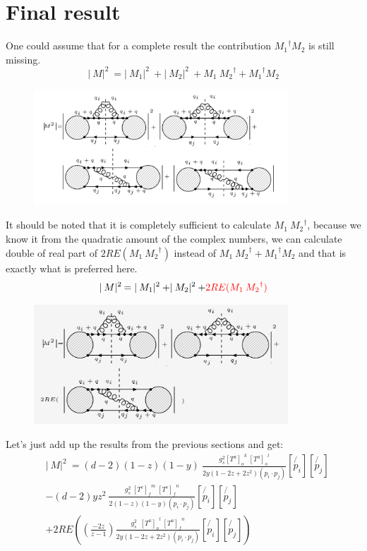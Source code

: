 \section{Final result}
One could assume that for a complete result the contribution $ {M_1}^{\dagger} M_2 $ is still missing.
\begin{equation}
\lvert\:M\lvert^2\: = \lvert\:M_1\lvert^2\:+\lvert\:M_2\lvert^2\:+ M_1\: {M_2}^{\dagger} +{M_1}^{\dagger} M_2
\end{equation}
\begin{figure}[h!]
\centering
\includegraphics[width=0.85\textwidth]{images/QQ/qqgMSquer.png}
\end{figure}
It should be noted that it is completely sufficient to calculate $M_1\: {M_2}^{\dagger}$, because we know it from the quadratic amount of the complex numbers, we can calculate double of real part of $2RE(M_1\: {M_2}^{\dagger})$ instead of $ M_1\: {M_2}^{\dagger} +{M_1}^{\dagger} M_2 $ and that is exactly what is preferred here.
\begin{equation}
\lvert\:M\lvert^2\: = \lvert\:M_1\lvert^2\:+\lvert\:M_2\lvert^2\:+ {\color[RGB]{255,0,0} 2RE(M_1\: {M_2}^{\dagger})}
\end{equation}
\begin{figure}[h!]
\centering
\includegraphics[width=0.85\textwidth]{images/QQ/REqqgMSquer.png}
\end{figure}
Let's just add up the results from the previous sections and get:
\begin{equation}
\begin{split}
&\lvert\:M\lvert^2\: = (d-2)(1-z)(1-y)\:\frac{g_s^2  {[T^a]_{o}}^k \: {[T^a]_o}^l }{2y(1-2z+2z^2)(p_i \cdot p_j)}
[\not{p_i}][\not{p_j}]\\
&-(d-2)yz^2\:\frac{g_s^2 \: {[T^c]_f}^m \: {[T^c]_{f}}^n }{2(1-z)(1-y)(p_i \cdot p_j)}
[\not{p_i}][\not{p_j}]\\
&+2RE((\frac{-2z}{z-1}) \frac{g_s^2 \:\:{[T^a]_o}^l \:{[T^a]_{f}}^n }{2y(1-2z+2z^2)(p_i \cdot p_j)} 
[\not{p_i}][\not{p_j}])
\end{split}
\end{equation}
